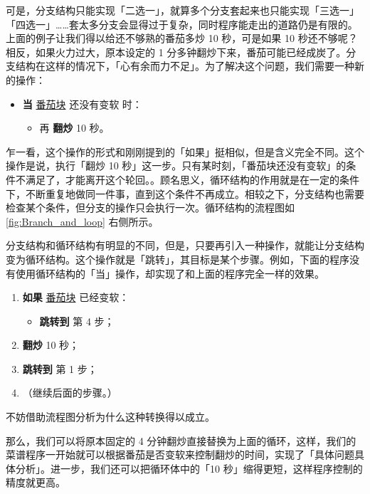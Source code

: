 可是，分支结构只能实现「二选一」，就算多个分支套起来也只能实现「三选一」「四选一」……套太多分支会显得过于复杂，同时程序能走出的道路仍是有限的。上面的例子让我们得以给还不够熟的番茄多炒 10 秒，可是如果 10 秒还不够呢？相反，如果火力过大，原本设定的 1 分多钟翻炒下来，番茄可能已经成炭了。分支结构在这样的情况下，「心有余而力不足」。为了解决这个问题，我们需要一种新的操作：

\begin{itemize}
  \item \textbf{当} \underline{番茄块} 还没有变软 时：
    \begin{itemize}
      \item 再 \textbf{翻炒} 10 秒。
    \end{itemize}
\end{itemize}

乍一看，这个操作的形式和刚刚提到的「如果」挺相似，但是含义完全不同。这个操作是说，执行「翻炒 10 秒」这一步。只有某时刻，「番茄块还没有变软」的条件不满足了，才能离开这个轮回。。顾名思义，循环结构的作用就是在一定的条件下，不断重复地做同一件事，直到这个条件不再成立。相较之下，分支结构也需要检查某个条件，但分支的操作只会执行一次。循环结构的流程图如\autoref{fig:Branch_and_loop} 右侧所示。

\begin{note}
  分支结构和循环结构有明显的不同，但是，只要再引入一种操作，就能让分支结构变为循环结构。这个操作就是「跳转」，其目标是某个步骤。例如，下面的程序没有使用循环结构的「当」操作，却实现了和上面的程序完全一样的效果。
  \begin{enumerate}
    \item \textbf{如果} \underline{番茄块} 已经变软：
      \begin{itemize}
        \item \textbf{跳转到} 第 4 步；
      \end{itemize}
    \item \textbf{翻炒} 10 秒；
    \item \textbf{跳转到} 第 1 步；
    \item （继续后面的步骤。）
  \end{enumerate}

  不妨借助流程图分析为什么这种转换得以成立。
\end{note}

那么，我们可以将原本固定的 4 分钟翻炒直接替换为上面的循环，这样，我们的菜谱程序一开始就可以根据番茄是否变软来控制翻炒的时间，实现了「具体问题具体分析」。进一步，我们还可以把循环体中的「10 秒」缩得更短，这样程序控制的精度就更高。

